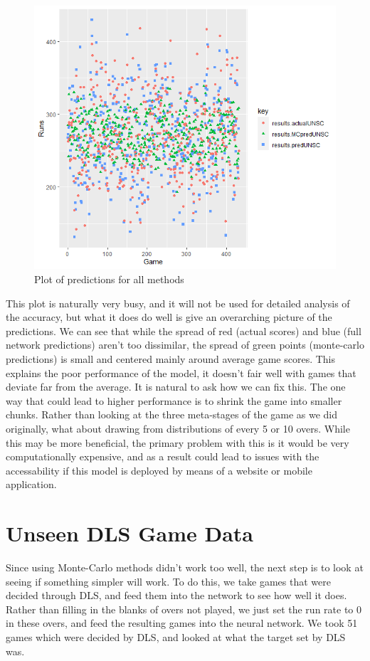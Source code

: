 \begin{figure}[h]
    \label{fullPredDist}
    \centering
    \caption{Plot of predictions for all methods}
    \includegraphics[scale=0.6]{figures/fullPredDist.png}
\end{figure}

This plot is naturally very busy, and it will not be used for detailed analysis of the accuracy, but what it does do well is give an overarching picture of the predictions. 
We can see that while the spread of red (actual scores) and blue (full network predictions) aren't too dissimilar, the spread of green points (monte-carlo predictions) is small and centered mainly 
around average game scores. This explains the poor performance of the model, it doesn't fair well with games that deviate far from the average. It is natural to ask how we can fix this. The one way that 
could lead to higher performance is to shrink the game into smaller chunks. Rather than looking at the three meta-stages of the game as we did originally, what about drawing from distributions of every 5 or 10 overs.
While this may be more beneficial, the primary problem with this is it would be very computationally expensive, and as a result could lead to issues with the accessability if this model is deployed 
by means of a website or mobile application. 

\section{Unseen DLS Game Data}
\label{unsGame}
Since using Monte-Carlo methods didn't work too well, the next step is to look at seeing if something simpler will work. To do this, we take games that were decided through DLS, and 
feed them into the network to see how well it does. Rather than filling in the blanks of overs not played, we just set the run rate to 0 in these overs, and feed the resulting games into the neural network. 
We took 51 games which were decided by DLS, and looked at what the target set by DLS was. \\

